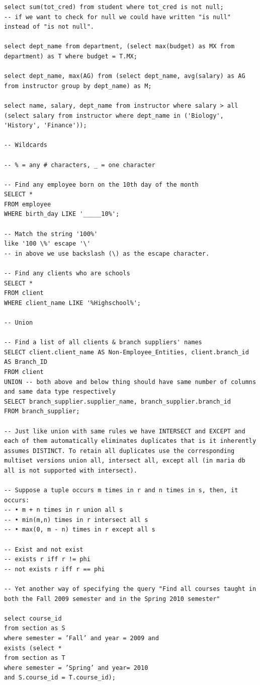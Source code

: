 \documentclass[8pt, a4paper, oneside, twocolumn]{extarticle}
\begin{document}
\begin{verbatim}
select sum(tot_cred) from student where tot_cred is not null;
-- if we want to check for null we could have written "is null" instead of "is not null".

select dept_name from department, (select max(budget) as MX from department) as T where budget = T.MX;

select dept_name, max(AG) from (select dept_name, avg(salary) as AG from instructor group by dept_name) as M;

select name, salary, dept_name from instructor where salary > all (select salary from instructor where dept_name in ('Biology', 'History', 'Finance'));

-- Wildcards

-- % = any # characters, _ = one character

-- Find any employee born on the 10th day of the month
SELECT *
FROM employee
WHERE birth_day LIKE '_____10%';

-- Match the string '100%'
like '100 \%' escape '\'
-- in above we use backslash (\) as the escape character.

-- Find any clients who are schools
SELECT *
FROM client
WHERE client_name LIKE '%Highschool%';

-- Union 

-- Find a list of all clients & branch suppliers' names
SELECT client.client_name AS Non-Employee_Entities, client.branch_id AS Branch_ID
FROM client
UNION -- both above and below thing should have same number of columns and same data type respectively
SELECT branch_supplier.supplier_name, branch_supplier.branch_id
FROM branch_supplier;

-- Just like union with same rules we have INTERSECT and EXCEPT and each of them automatically eliminates duplicates that is it inherently assumes DISTINCT. To retain all duplicates use the corresponding multiset versions union all, intersect all, except all (in maria db all is not supported with intersect).

-- Suppose a tuple occurs m times in r and n times in s, then, it occurs:
-- • m + n times in r union all s
-- • min(m,n) times in r intersect all s
-- • max(0, m - n) times in r except all s

-- Exist and not exist
-- exists r iff r != phi
-- not exists r iff r == phi

-- Yet another way of specifying the query "Find all courses taught in both the Fall 2009 semester and in the Spring 2010 semester"

select course_id
from section as S
where semester = ’Fall’ and year = 2009 and
exists (select *
from section as T
where semester = ’Spring’ and year= 2010
and S.course_id = T.course_id);


\end{verbatim}
\end{document}
